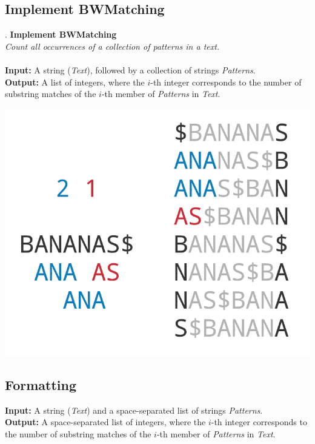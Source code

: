 \documentclass{article}
\renewcommand{\sc}[1]{\text{\scshape #1}}
\begin{document}
\subsection{Implement BWMatching}.
\hline\vspace{5}
\noindent\textbf{Implement BWMatching}\\
\emph{Count all occurrences of a collection of patterns in a text.}\\ \\
\textbf{Input:} A string \sc{BWT}(\emph{Text}), followed by a collection of strings \emph{Patterns}.\\
\textbf{Output:} A list of integers, where the $i$-th integer corresponds to the number of substring matches of the $i$-th member of \emph{Patterns} in \emph{Text}.
\begin{center}
    \includegraphics[scale=0.2]{c9/logos/9LM.png} 
\end{center}
\hline\vspace{5}

\subsection*{Formatting}
\textbf{Input:} A string \sc{BWT}(\emph{Text}) and a space-separated list of strings \emph{Patterns}.\\
\noindent\textbf{Output:} A space-separated list of integers, where the $i$-th integer corresponds to the number of substring matches of the $i$-th member of \emph{Patterns} in \emph{Text}.
\end{document}
